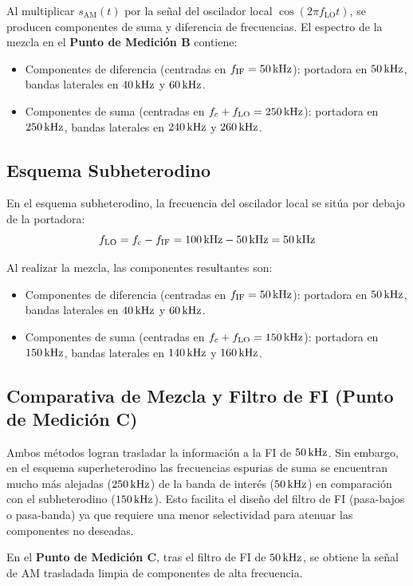 Al multiplicar $s_{\text{AM}}(t)$ por la señal del oscilador local $\cos(2\pi f_{\text{LO}} t)$, se producen
componentes de suma y diferencia de frecuencias. El espectro de la mezcla en el \textbf{Punto de Medición B} contiene:
\begin{itemize}
    \item Componentes de diferencia (centradas en $f_{\text{IF}} = 50\,\mathrm{kHz}$): portadora en $50\,\mathrm{kHz}$, bandas laterales
          en $40\,\mathrm{kHz}$ y $60\,\mathrm{kHz}$.
    \item Componentes de suma (centradas en $f_c + f_{\text{LO}} = 250\,\mathrm{kHz}$): portadora en $250\,\mathrm{kHz}$, bandas laterales
          en $240\,\mathrm{kHz}$ y $260\,\mathrm{kHz}$.
\end{itemize}

\subsection{Esquema Subheterodino}
En el esquema subheterodino, la frecuencia del oscilador local se sitúa por debajo de la portadora:
\begin{equation}
    f_{\text{LO}} = f_c - f_{\text{IF}} = 100\,\mathrm{kHz} - 50\,\mathrm{kHz} = 50\,\mathrm{kHz}
\end{equation}

Al realizar la mezcla, las componentes resultantes son:
\begin{itemize}
    \item Componentes de diferencia (centradas en $f_{\text{IF}} = 50\,\mathrm{kHz}$): portadora en $50\,\mathrm{kHz}$, bandas laterales
          en $40\,\mathrm{kHz}$ y $60\,\mathrm{kHz}$.
    \item Componentes de suma (centradas en $f_c + f_{\text{LO}} = 150\,\mathrm{kHz}$): portadora en $150\,\mathrm{kHz}$, bandas laterales
          en $140\,\mathrm{kHz}$ y $160\,\mathrm{kHz}$.
\end{itemize}

\subsection{Comparativa de Mezcla y Filtro de FI (Punto de Medición C)}
Ambos métodos logran trasladar la información a la FI de $50\,\mathrm{kHz}$. Sin embargo, en el esquema superheterodino las
frecuencias espurias de suma se encuentran mucho más alejadas ($250\,\mathrm{kHz}$) de la banda de interés ($50\,\mathrm{kHz}$) en
comparación con el subheterodino ($150\,\mathrm{kHz}$). Esto facilita el diseño del filtro de FI (pasa-bajos o pasa-banda)
ya que requiere una menor selectividad para atenuar las componentes no deseadas.

En el \textbf{Punto de Medición C}, tras el filtro de FI de $50\,\mathrm{kHz}$, se obtiene la señal de AM trasladada limpia de
componentes de alta frecuencia.

